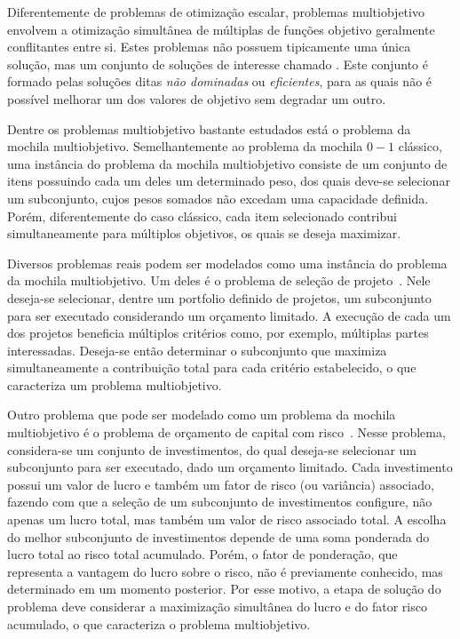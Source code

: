 Diferentemente de problemas de otimização escalar, problemas multiobjetivo
envolvem a otimização simultânea de múltiplas de funções objetivo geralmente
conflitantes entre si.
Estes problemas não possuem tipicamente uma única solução, mas um conjunto
de soluções de interesse chamado \emph{\paretoset{}}.
Este conjunto é formado pelas soluções ditas \emph{não dominadas} ou \emph{eficientes},
para as quais não é possível melhorar um dos valores de objetivo sem degradar um outro.

Dentre os problemas multiobjetivo bastante estudados
está o problema da mochila multiobjetivo.
Semelhantemente ao problema da mochila $0-1$ clássico,
uma instância do problema da mochila multiobjetivo consiste de um conjunto
de itens possuindo cada um deles um determinado peso,
dos quais deve-se selecionar um subconjunto, cujos pesos somados não excedam uma
capacidade definida.
Porém, diferentemente do caso clássico, cada item selecionado contribui
simultaneamente para múltiplos objetivos, os quais se deseja maximizar.


Diversos problemas reais podem ser modelados como uma instância do problema da mochila multiobjetivo.
Um deles é o problema de seleção de projeto~\cite{teng1996multiobjective}.
Nele deseja-se selecionar, dentre um portfolio definido de projetos,
um subconjunto para ser executado considerando um orçamento limitado.
A execução de cada um dos projetos beneficia múltiplos critérios como,
por exemplo, múltiplas partes interessadas.
Deseja-se então determinar o subconjunto que maximiza simultaneamente a contribuição total
para cada critério estabelecido, o que caracteriza um problema multiobjetivo.

Outro problema que pode ser modelado como um problema da mochila multiobjetivo
é o problema de orçamento de capital com risco~\cite{rosenblatt1989generating}.
Nesse problema, considera-se um conjunto de investimentos,
do qual deseja-se selecionar um subconjunto para ser executado, dado um orçamento limitado.
Cada investimento possui um valor de lucro e também um fator de risco (ou variância) associado,
fazendo com que a seleção de um subconjunto de investimentos configure, não apenas um lucro total,
mas também um valor de risco associado total.
A escolha do melhor subconjunto de investimentos depende de uma soma ponderada do lucro total
ao risco total acumulado.
Porém, o fator de ponderação, que representa a vantagem do lucro sobre o risco,
não é previamente conhecido, mas determinado em um momento posterior.
Por esse motivo, a etapa de solução do problema deve considerar
a maximização simultânea do lucro e do fator risco acumulado,
o que caracteriza o problema multiobjetivo.

